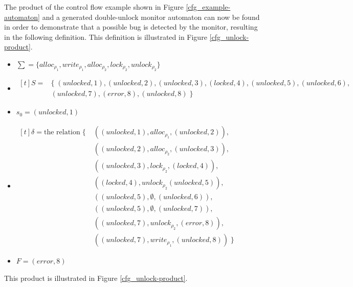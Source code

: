 \newpar The product of the control flow example shown in Figure \ref{cfg_example-automaton} and a generated double-unlock monitor automaton can now be found in order to demonstrate that a possible bug is detected by the monitor, resulting in the following definition. This definition is illustrated in Figure \ref{cfg_unlock-product}. 

\begin{itemize}
    \item{
        $ \sum = \{alloc_{\rho_1}, write_{\rho_1}, alloc_{\rho_2}, lock_{\rho_2}, unlock_{\rho_2}\} $
    }
    \item{
        $
            \begin{aligned}[t]
                S = & \{\;(unlocked, 1), (unlocked, 2), (unlocked, 3), (locked, 4), (unlocked, 5), (unlocked, 6),\\
                & (unlocked, 7), (error, 8), (unlocked, 8) \; \}
            \end{aligned}
        $
    }
    \item $s_0 = (unlocked, 1)$ 
    \item {
        $
            \begin{aligned}[t]
            \delta = \text{the relation} \; \{ \; & ((unlocked, 1), alloc_{\rho_1}, (unlocked, 2)), \\
            & ((unlocked, 2), alloc_{\rho_2}, (unlocked, 3)), \\
            & ((unlocked, 3), lock_{\rho_2}, (locked, 4)), \\
            & ((locked, 4), unlock_{\rho_2} (unlocked, 5)), \\
            & ((unlocked, 5), \emptyset, (unlocked, 6)), \\
            & ((unlocked, 5), \emptyset, (unlocked, 7)),\\
            & ((unlocked, 7), unlock_{\rho_2}, (error, 8)), \\
            & ((unlocked, 7), write_{\rho_1}, (unlocked, 8)) \; \}
            \end{aligned}
        $ 
    }
    \item $F = (error, 8)$  
\end{itemize}

\noindent This product is illustrated in Figure \ref{cfg_unlock-product}. 

